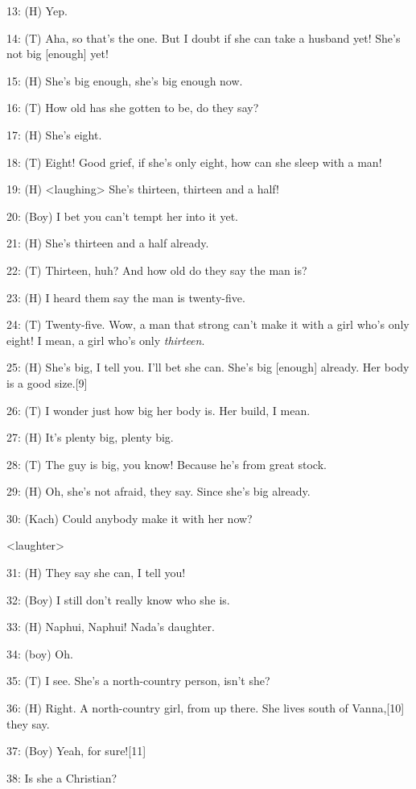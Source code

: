 {13: (H) Yep.}

{14: (T) Aha, so that's the one. But I doubt if she can take a husband yet!
She's not big [enough] yet!}

{15: (H) She's big enough, she's big enough now. }

{16: (T) How old has she gotten to be, do they say?}

{17: (H) She's eight.}

{18: (T) Eight! Good grief, if she's only eight, how can she sleep with
a man!}

{19: (H) <laughing> She's thirteen, thirteen and a half!}

{20: (Boy) I bet you can't tempt her into it yet.}

{21: (H) She's thirteen and a half already.}

{22: (T) Thirteen, huh? And how old do they say the man is? }

{23: (H) I heard them say the man is twenty-five.}

{24: (T) Twenty-five. Wow, a man that strong can't make it with a girl who's
only eight! I mean, a girl who's only }{\textit{thirteen}}{.}

{25: (H) She's big, I tell you. I'll bet she can. She's big [enough] already.
Her body is a good size.[9]}

{26: (T) I wonder just how big her body is. Her build, I mean.}

{27: (H) It's plenty big, plenty big.}

{28: (T) The guy is big, you know! Because he's from great stock. }

{29: (H) Oh, she's not afraid, they say. Since she's big already.}

{30: (Kach) Could anybody make it with her now?}

{<laughter>}

{31: (H) They say she can, I tell you!}

{32: (Boy) I still don't really know who she is.}

{33: (H) Naphui, Naphui! Nada's daughter. }

{34: (boy) Oh.}

{35: (T) I see. She's a north-country person, isn't she?}

{36: (H) Right. A north-country girl, from up there. She lives south of
Vanna,[10] they say. }

{37: (Boy) Yeah, for sure![11]}

{38: Is she a Christian?}

